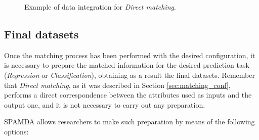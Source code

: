 \documentclass[energies,article,submit,moreauthors,pdftex]{Definitions/mdpi}
\begin{document}
				\begin{figure}[ht!]
					\centering
					\hfill
					\hfill
					\caption{Example of data integration for \textit{Direct matching}.} \label{fig:directMatching}
				\end{figure}
				
			\subsection{Final datasets} \label{sec:FinalDatasets}

				Once the matching process has been performed with the desired configuration, it is necessary to prepare the matched information for the desired prediction task (\textit{Regression} or \textit{Classification}), obtaining as a result the final datasets. Remember that \textit{Direct matching}, as it was described in Section \ref{sec:matching_conf}, performs a direct correspondence between the attributes used as inputs and the output one, and it is not necessary to carry out any preparation.
				
				SPAMDA allows researchers to make such preparation by means of the following options:
				
\end{document}
